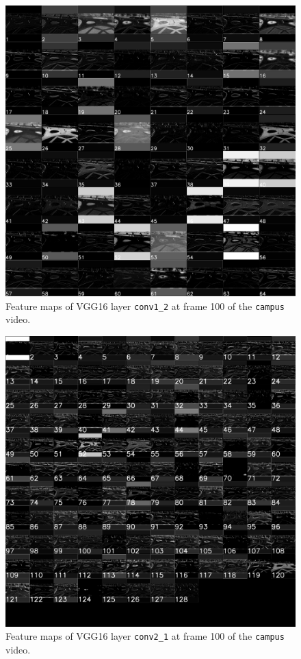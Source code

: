 \documentclass[hidelinks]{article}
\begin{document}
\begin{figure}[H]
  \centering
  \includegraphics[scale=0.23]{acts_conv1_2}
  \caption{Feature maps of VGG16 layer \texttt{conv1\_2} at frame 100 of the \texttt{campus} video.}
  \label{fig:acts_conv1_2}
\end{figure}

\begin{figure}[H]
  \centering
  \includegraphics[scale=0.30]{acts_conv2_1}
  \caption{Feature maps of VGG16 layer \texttt{conv2\_1} at frame 100 of the \texttt{campus} video.}
  \label{fig:acts_conv2_1}
\end{figure}
\end{document}
